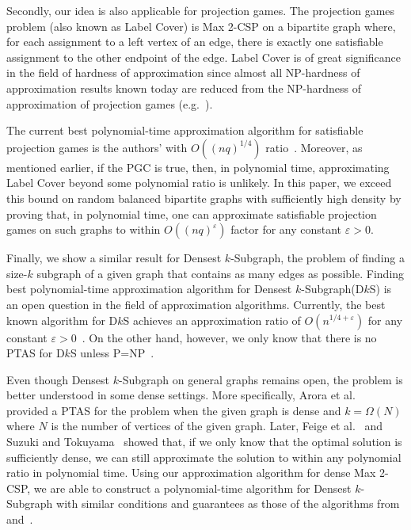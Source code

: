 \documentclass{article}
\begin{document}
Secondly, our idea is also applicable for projection games. The projection games problem (also known as {\sc Label Cover}) is {\sc Max 2-CSP} on a bipartite graph where, for each assignment to a left vertex of an edge, there is exactly one satisfiable assignment to the other endpoint of the edge. {\sc Label Cover} is of great significance in the field of hardness of approximation since almost all NP-hardness of approximation results known today are reduced from the NP-hardness of approximation of projection games (e.g.~\cite{BGS,Has97}).

The current best polynomial-time approximation algorithm for satisfiable projection games is the authors' with $O((nq)^{1/4})$ ratio~\cite{MM13}. Moreover, as mentioned earlier, if the PGC is true, then, in polynomial time, approximating {\sc Label Cover} beyond some polynomial ratio is unlikely. In this paper, we exceed this bound on random balanced bipartite graphs with sufficiently high density by proving that, in polynomial time, one can approximate satisfiable projection games on such graphs to within $O((nq)^\varepsilon)$ factor for any constant $\varepsilon > 0$.

Finally, we show a similar result for {\sc Densest $k$-Subgraph}, the problem of finding a size-$k$ subgraph of a given graph that contains as many edges as possible. Finding best polynomial-time approximation algorithm for {\sc Densest $k$-Subgraph}({\sc D$k$S}) is an open question in the field of approximation algorithms. Currently, the best known algorithm for {\sc D$k$S} achieves an approximation ratio of $O(n^{1/4+\varepsilon})$ for any constant $\varepsilon > 0$~\cite{BCCFV}. On the other hand, however, we only know that there is no PTAS for {\sc D$k$S} unless P=NP~\cite{Khot04}.

Even though {\sc Densest $k$-Subgraph} on general graphs remains open, the problem is better understood in some dense settings. More specifically, Arora et al.~\cite{AKK95} provided a PTAS for the problem when the given graph is dense and $k = \Omega(N)$ where $N$ is the number of vertices of the given graph. Later, Feige et al.~\cite{FPK01} and Suzuki and Tokuyama~\cite{ST05} showed that, if we only know that the optimal solution is sufficiently dense, we can still approximate the solution to within any polynomial ratio in polynomial time. Using our approximation algorithm for dense {\sc Max 2-CSP}, we are able to construct a polynomial-time algorithm for {\sc Densest $k$-Subgraph} with similar conditions and guarantees as those of the algorithms from~\cite{FPK01} and~\cite{ST05}.
\end{document}
